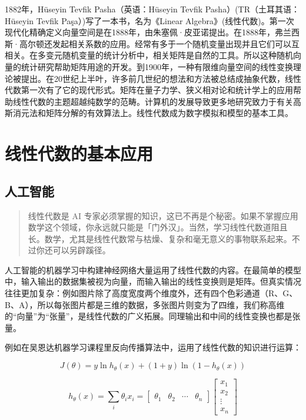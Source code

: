 \documentclass{article}
\begin{document}
1882年，Hüseyin Tevfik Pasha（英语：Hüseyin Tevfik Pasha）(TR（土耳其语：Hüseyin Tevfik Paşa）)写了一本书，名为《Linear Algebra》(线性代数)。第一次现代化精确定义向量空间是在1888年，由朱塞佩·皮亚诺提出。在1888年，弗兰西斯·高尔顿还发起相关系数的应用。经常有多于一个随机变量出现并且它们可以互相关。在多变元随机变量的统计分析中，相关矩阵是自然的工具。所以这种随机向量的统计研究帮助矩阵用途的开发。到1900年，一种有限维向量空间的线性变换理论被提出。在20世纪上半叶，许多前几世纪的想法和方法被总结成抽象代数，线性代数第一次有了它的现代形式。矩阵在量子力学、狭义相对论和统计学上的应用帮助线性代数的主题超越纯数学的范畴。计算机的发展导致更多地研究致力于有关高斯消元法和矩阵分解的有效算法上。线性代数成为数字模拟和模型的基本工具。

\section{线性代数的基本应用}
\subsection{人工智能}

\begin{quote}
    线性代数是 AI 专家必须掌握的知识，这已不再是个秘密。如果不掌握应用数学这个领域，你永远就只能是「门外汉」。当然，学习线性代数道阻且长。数学，尤其是线性代数常与枯燥、复杂和毫无意义的事物联系起来。不过你还可以另辟蹊径。

    \author{——Oleksii Kharkovyna, \it{TowardsDataScience}}
\end{quote}

人工智能的机器学习中构建神经网络大量运用了线性代数的内容。在最简单的模型中，输入输出的数据集被视为向量，而输入输出的线性变换则是矩阵。但真实情况往往更加复杂：例如图片除了高度宽度两个维度外，还有四个色彩通道（R、G、B、A），所以每张图片都是三维的数据，多张图片则变为了四维，我们称高维的“向量”为“张量”，是线性代数的广义拓展。同理输出和中间的线性变换也都是张量。

例如在吴恩达机器学习课程\cite{2}里反向传播算法中，运用了线性代数的知识进行运算：

\begin{definition}[对数似然代价函数]
    \[J\left(\theta\right)=y\ln h_\theta\left(x\right)+\left(1+y\right)\ln\left(1-h_\theta\left(x\right)\right)\]
\end{definition}


\begin{definition}[对数似然代价函数]
    \[h_\theta\left(x\right)=\sum_i\theta_ix_i=
        \begin{bmatrix}\theta_1&\theta_2&\cdots&\theta_n\end{bmatrix}
        \begin{bmatrix}x_1\\x_2\\\vdots\\x_n\end{bmatrix}\]
\end{definition}
\end{document}
